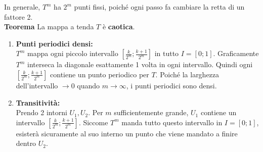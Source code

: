 \documentclass[openany]{book}
\theoremstyle{definition}
\theoremstyle{remark}
\begin{document}
\vspace{1em}
In generale, $T^m$ ha $2^m$ punti fissi, poiché ogni passo fa cambiare la retta di un fattore 2.
\\
\textbf{Teorema}
La mappa a tenda $T$ è \textbf{caotica}.

\begin{enumerate}

\item \textbf{ Punti periodici densi:} \\
$T^m$ mappa ogni piccolo intervallo $\left[\frac{k}{2^m}; \frac{k+1}{2^m}\right]$ in tutto $I = [0; 1]$.
Graficamente $T^m$ interseca la diagonale esattamente 1 volta in ogni intervallo.
Quindi ogni $\left[\frac{k}{2^m}; \frac{k+1}{2^m}\right]$ contiene un punto periodico per $T$.
Poiché la larghezza dell'intervallo $\to 0$ quando $m \to \infty$, i punti periodici sono densi.

\vspace{0.5em}
\begin{center}
\end{center}


    \item \textbf{Transitività:} \\
    Prendo 2 intorni $U_1, U_2$. Per $m$ sufficientemente grande, $U_1$ contiene un intervallo $\left[ \frac{k}{2^m}; \frac{k+1}{2^m} \right]$.
    Siccome $T^m$ manda tutto questo intervallo in $I = [0; 1]$, esisterà sicuramente al suo interno un punto che viene mandato a finire dentro $U_2$.
    
    \begin{center}
\end{center}
\end{enumerate}
\end{document}
